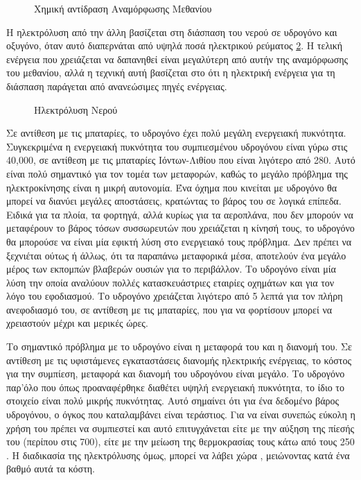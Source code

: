 \documentclass[12pt]{report}
\begin{document}
\begin{figure}
\center
{}
\caption{Χημική αντίδραση Αναμόρφωσης Μεθανίου}
\label{eq:reform}
\end{figure}

Η ηλεκτρόλυση από την άλλη βασίζεται στη διάσπαση του νερού σε υδρογόνο και οξυγόνο, όταν αυτό διαπερνάται από υψηλά ποσά ηλεκτρικού ρεύματος \ref{eq:electrolysis}. Η τελική ενέργεια που χρειάζεται να δαπανηθεί είναι
μεγαλύτερη από αυτήν της αναμόρφωσης του μεθανίου, αλλά η τεχνική αυτή βασίζεται στο ότι η ηλεκτρική ενέργεια για τη διάσπαση παράγεται από ανανεώσιμες πηγές ενέργειας. 

\begin{figure}
\center
{}
\caption{Ηλεκτρόλυση Νερού}
\label{eq:electrolysis}
\end{figure}

Σε αντίθεση με τις μπαταρίες, το υδρογόνο έχει πολύ μεγάλη ενεργειακή πυκνότητα.
Συγκεκριμένα η ενεργειακή πυκνότητα του συμπιεσμένου υδρογόνου είναι γύρω στις 40,000{}, σε αντίθεση με τις μπαταρίες Ιόντων-Λιθίου που είναι λιγότερο από 280{}. Αυτό είναι 
πολύ σημαντικό για τον τομέα των μεταφορών, καθώς το μεγάλο πρόβλημα της ηλεκτροκίνησης είναι η μικρή αυτονομία. Ένα όχημα που κινείται με υδρογόνο θα μπορεί να διανύει μεγάλες αποστάσεις, κρατώντας το βάρος του σε λογικά επίπεδα.
Ειδικά για τα πλοία, τα φορτηγά, αλλά κυρίως για τα αεροπλάνα, που δεν μπορούν να μεταφέρουν το βάρος τόσων συσσωρευτών που χρειάζεται η κίνησή τους, το υδρογόνο θα μπορούσε να είναι μία εφικτή λύση στο ενεργειακό τους πρόβλημα. 
Δεν πρέπει να ξεχνιέται ούτως ή άλλως, ότι τα παραπάνω μεταφορικά μέσα, αποτελούν ένα μεγάλο μέρος των εκπομπών βλαβερών ουσιών για το περιβάλλον. Το υδρογόνο είναι μία λύση την οποία αναλύουν πολλές κατασκευάστριες εταιρίες 
οχημάτων και για τον λόγο του εφοδιασμού. Το υδρογόνο χρειάζεται λιγότερο από 5 λεπτά για τον πλήρη ανεφοδιασμό του, σε αντίθεση με τις μπαταρίες, που για να φορτίσουν μπορεί να χρειαστούν μέχρι και μερικές ώρες. 

Το σημαντικό πρόβλημα με το υδρογόνο είναι η μεταφορά του και η διανομή του. Σε αντίθεση με τις υφιστάμενες εγκαταστάσεις διανομής ηλεκτρικής ενέργειας, το κόστος για την συμπίεση, μεταφορά και διανομή του υδρογόνου είναι μεγάλο.
Το υδρογόνο παρ'όλο που όπως προαναφέρθηκε διαθέτει υψηλή ενεργειακή πυκνότητα, το ίδιο το στοιχείο είναι πολύ μικρής πυκνότητας. Αυτό σημαίνει ότι για ένα δεδομένο βάρος υδρογόνου, ο όγκος που καταλαμβάνει είναι τεράστιος.
Για να είναι συνεπώς εύκολη η χρήση του πρέπει να συμπιεστεί και αυτό επιτυγχάνεται είτε με την αύξηση της πίεσής του (περίπου στις 700{}), είτε με την μείωση της θερμοκρασίας τους κάτω από τους 
250 {}. Η διαδικασία της ηλεκτρόλυσης όμως, μπορεί να λάβει χώρα {}, μειώνοντας κατά ένα βαθμό αυτά τα κόστη.
\end{document}
